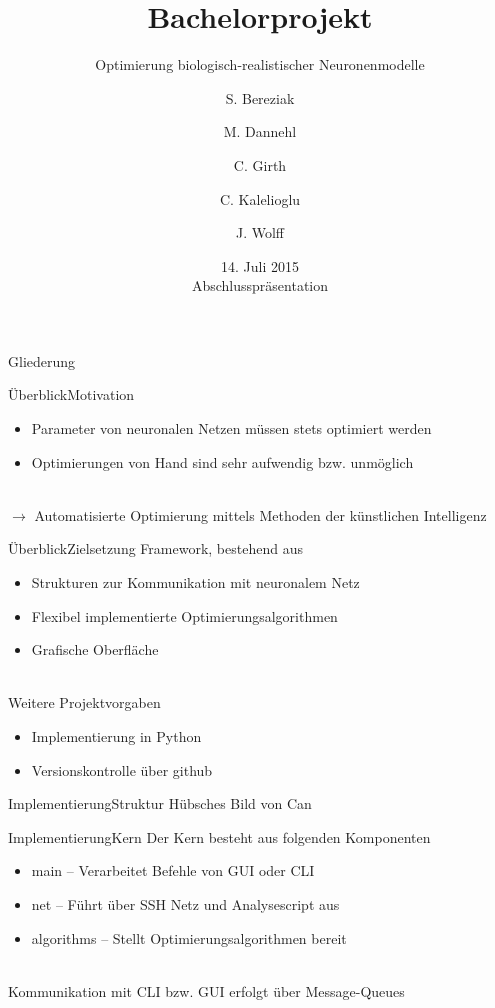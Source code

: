 \documentclass[ngerman,10pt,xcolor=colortbl,compress
]{beamer}
\title{Bachelorprojekt }
\subtitle{Optimierung biologisch-realistischer Neuronenmodelle}
\date[]{14. Juli 2015\\[1ex]Abschlusspräsentation}
\author[Bereziak \and Dannehl \and Girth \and Kalelioglu \and Wolff]{S. Bereziak \and M. Dannehl \and C. Girth \and C. Kalelioglu \and J. Wolff}
\institute[UzL]{Institut für Robotik und kognitive Systeme\\Universität zu Lübeck}
\begin{document}
	\maketitle
	\begin{frame}{Gliederung}
		\tableofcontents
	\end{frame}	
	
	\begin{frame}{Überblick}{Motivation}
	\begin{itemize}
	\item Parameter von neuronalen Netzen müssen stets optimiert werden
	\item Optimierungen von Hand sind sehr aufwendig bzw. unmöglich
	\end{itemize}
	\mbox{}\\
	$\rightarrow$ Automatisierte Optimierung mittels Methoden der künstlichen Intelligenz
	\end{frame}
	\begin{frame}{Überblick}{Zielsetzung}
	Framework, bestehend aus
	\begin{itemize}
		\item Strukturen zur Kommunikation mit neuronalem Netz
		\item Flexibel implementierte Optimierungsalgorithmen
		\item Grafische Oberfläche
	\end{itemize}
	\mbox{}\\
	Weitere Projektvorgaben
	\begin{itemize}
		\item Implementierung in Python
		\item Versionskontrolle über github
	\end{itemize}
	\end{frame}
	
	
	\begin{frame}{Implementierung}{Struktur}
	Hübsches Bild von Can
	\end{frame}
	\begin{frame}{Implementierung}{Kern}
	Der Kern besteht aus folgenden Komponenten
	\begin{itemize}
		\item main -- Verarbeitet Befehle von GUI oder CLI
		\item net -- Führt über SSH Netz und Analysescript aus
		\item algorithms -- Stellt Optimierungsalgorithmen bereit 
	\end{itemize}
	\mbox{}\\
	Kommunikation mit CLI bzw. GUI erfolgt über Message-Queues
	\end{frame}
	
\end{document}
